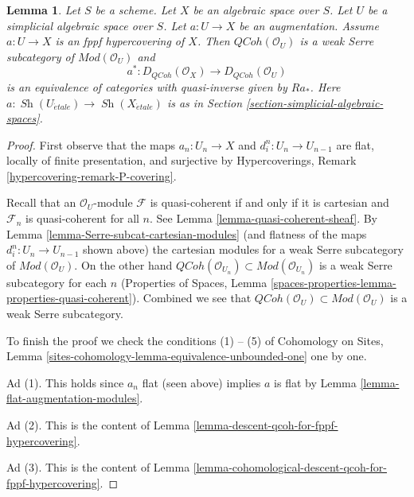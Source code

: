 \documentclass{stacks-project}
\theoremstyle{plain}
\newtheorem{lemma}[subsection]{Lemma}
\theoremstyle{definition}
\theoremstyle{remark}
\numberwithin{equation}{subsection}
\def\Sh{\mathop{\mathit{Sh}}\nolimits}
\def\etale{{\acute{e}tale}}
\def\QCoh{\mathit{QCoh}}
\begin{document}
\begin{lemma}
\label{lemma-coh-descent-qcoh-unbounded-for-fppf-hypercovering}
Let $S$ be a scheme. Let $X$ be an algebraic space over $S$.
Let $U$ be a simplicial algebraic space over $S$. Let $a : U \to X$
be an augmentation. Assume $a : U \to X$ is an fppf hypercovering of $X$.
Then $\QCoh(\mathcal{O}_U)$ is a weak Serre subcategory of
$\textit{Mod}(\mathcal{O}_U)$ and
$$
a^* : D_\QCoh(\mathcal{O}_X) \longrightarrow D_\QCoh(\mathcal{O}_U)
$$
is an equivalence of categories with quasi-inverse given by
$Ra_*$. Here $a : \Sh(U_\etale) \to \Sh(X_\etale)$
is as in Section \ref{section-simplicial-algebraic-spaces}.
\end{lemma}

\begin{proof}
First observe that the maps $a_n : U_n \to X$ and $d^n_i : U_n \to U_{n - 1}$
are flat, locally of finite presentation, and surjective by
Hypercoverings, Remark \ref{hypercovering-remark-P-covering}.

\medskip\noindent
Recall that an $\mathcal{O}_U$-module $\mathcal{F}$ is quasi-coherent if and
only if it is cartesian and $\mathcal{F}_n$ is quasi-coherent for all $n$.
See Lemma \ref{lemma-quasi-coherent-sheaf}.
By Lemma \ref{lemma-Serre-subcat-cartesian-modules}
(and flatness of the maps $d^n_i : U_n \to U_{n - 1}$ shown above)
the cartesian modules for a weak Serre subcategory of
$\textit{Mod}(\mathcal{O}_U)$. On the other hand
$\QCoh(\mathcal{O}_{U_n}) \subset \textit{Mod}(\mathcal{O}_{U_n})$
is a weak Serre subcategory for each $n$
(Properties of Spaces, Lemma
\ref{spaces-properties-lemma-properties-quasi-coherent}).
Combined we see that
$\QCoh(\mathcal{O}_U) \subset \textit{Mod}(\mathcal{O}_U)$
is a weak Serre subcategory.

\medskip\noindent
To finish the proof we check the conditions (1) -- (5) of
Cohomology on Sites, Lemma
\ref{sites-cohomology-lemma-equivalence-unbounded-one} one by one.

\medskip\noindent
Ad (1). This holds since $a_n$ flat (seen above) implies $a$ is flat
by Lemma \ref{lemma-flat-augmentation-modules}.

\medskip\noindent
Ad (2). This is the content of
Lemma \ref{lemma-descent-qcoh-for-fppf-hypercovering}.

\medskip\noindent
Ad (3). This is the content of
Lemma \ref{lemma-cohomological-descent-qcoh-for-fppf-hypercovering}.


\end{proof}
\end{document}
